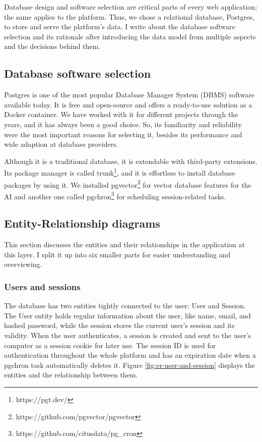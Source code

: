 Database design and software selection are critical parts of every web application; the same applies to the platform. Thus, we chose a relational database, Postgres, to store and serve the platform's data. I write about the database software selection and its rationale after introducing the data model from multiple aspects and the decisions behind them.

\subsection{Database software selection}

Postgres is one of the most popular Database Manager System (DBMS) software available today. It is free and open-source and offers a ready-to-use solution as a Docker container. We have worked with it for different projects through the years, and it has always been a good choice. So, its familiarity and reliability were the most important reasons for selecting it, besides its performance and wide adaption at database providers. 

Although it is a traditional database, it is extendable with third-party extensions. Its package manager is called trunk\footnote{https://pgt.dev/}, and it is effortless to install database packages by using it. We installed pgvector\footnote{https://github.com/pgvector/pgvector} for vector database features for the AI and another one called pgchron\footnote{https://github.com/citusdata/pg_cron} for scheduling session-related tasks.

\subsection{Entity-Relationship diagrams}

This section discusses the entities and their relationships in the application at this layer. I split it up into six smaller parts for easier understanding and overviewing.

\subsubsection{Users and sessions}

The database has two entities tightly connected to the user: User and Session. The User entity holds regular information about the user, like name, email, and hashed password, while the session stores the current user's session and its validity. When the user authenticates, a session is created and sent to the user's computer as a session cookie for later use. The session ID is used for authentication throughout the whole platform and has an expiration date when a pgchron task automatically deletes it. Figure \ref{fig:er-user-and-session} displays the entities and the relationship between them.

